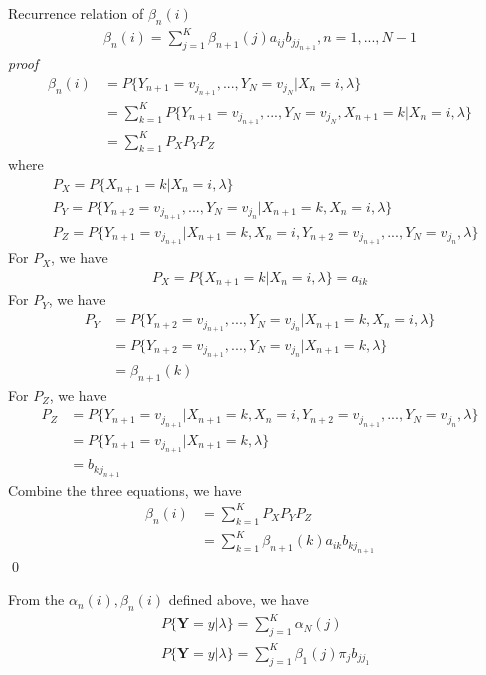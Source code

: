 \documentclass[runningheads]{llncs}
\begin{document}
\par
Recurrence relation of $\beta_n(i)$
\begin{align}
    \beta_n(i) = \sum_{j=1}^K \beta_{n+1}(j) a_{ij} b_{jj_{n+1}}, n = 1,...,N - 1
\end{align}
\emph{proof}
\begin{align}
    \beta_{n}(i) &= P \{ Y_{n+1} = v_{j_{n+1}},...,Y_N = v_{j_N} | X_n = i, \lambda \} \\
    &= \sum_{k=1}^K P \{ Y_{n+1} = v_{j_{n+1}},...,Y_N = v_{j_N}, X_{n+1} = k | X_n = i, \lambda \} \\
    &= \sum_{k=1}^K P_X P_Y P_Z
\end{align}
where
\begin{align}
    &P_X = P \{ X_{n+1} = k | X_n = i, \lambda \} \\
    &P_Y = P \{ Y_{n+2} = v_{j_{n+1}},..., Y_N = v_{j_n} | X_{n+1} = k, X_n = i, \lambda \} \\
    &P_Z = P \{ Y_{n+1} = v_{j_{n+1}} | X_{n+1} = k, X_n = i, Y_{n+2} = v_{j_{n+1}},..., Y_N = v_{j_n}, \lambda \}
\end{align}
For $P_X$, we have
\begin{align}
    P_X = P \{ X_{n+1} = k | X_n = i, \lambda \} = a_{ik}
\end{align}
For $P_Y$, we have
\begin{align}
    P_Y &= P \{ Y_{n+2} = v_{j_{n+1}},..., Y_N = v_{j_n} | X_{n+1} = k, X_n = i, \lambda \} \\
    &= P \{ Y_{n+2} = v_{j_{n+1}},..., Y_N = v_{j_n} | X_{n+1} = k, \lambda \} \\
    &= \beta_{n+1}(k)
\end{align}
For $P_Z$, we have
\begin{align}
    P_Z &= P \{ Y_{n+1} = v_{j_{n+1}} | X_{n+1} = k, X_n = i, Y_{n+2} = v_{j_{n+1}},..., Y_N = v_{j_n}, \lambda \} \\
    &= P \{ Y_{n+1} = v_{j_{n+1}} | X_{n+1} = k, \lambda \} \\
    &= b_{kj_{n+1}}
\end{align}
Combine the three equations, we have
\begin{align}
    \beta_n(i) &= \sum_{k=1}^K P_X P_Y P_Z \\
    &= \sum_{k=1}^K \beta_{n+1}(k) a_{ik} b_{kj_{n+1}}
\end{align} \qed
\par
From the $\alpha_n(i), \beta_n(i)$ defined above, we have
\begin{align}
    &P \{ \mathbf{Y} = y | \lambda \} = \sum_{j=1}^K \alpha_N(j) \\
    &P \{ \mathbf{Y} = y | \lambda \} = \sum_{j=1}^K \beta_1(j) \pi_j b_{jj_1} \\
\end{align}
\end{document}
